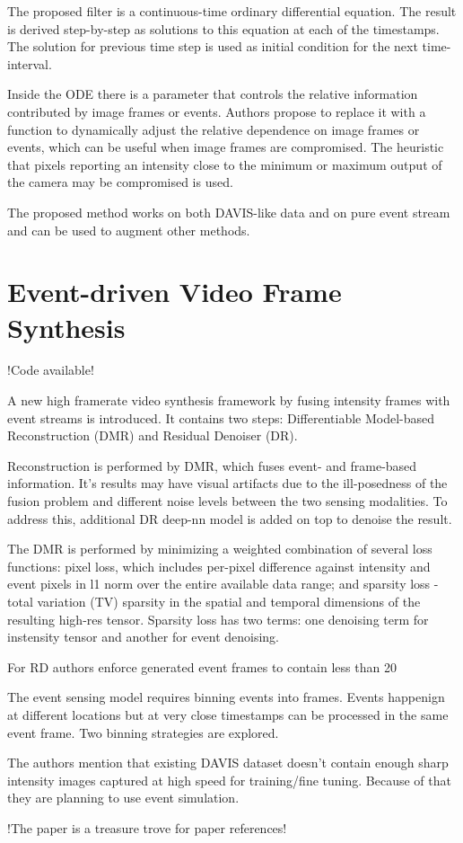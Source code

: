 \documentclass[10pt,a4paper]{article}
\begin{document}
The proposed filter is a continuous-time ordinary differential equation. The result is derived step-by-step as solutions to this equation at each of the timestamps. 
The solution for previous time step is used as initial condition for the next time-interval.

Inside the ODE there is a parameter that controls the relative information contributed by image frames or events. 
Authors propose to replace it with a function to dynamically adjust the relative dependence on image frames or events, which can be useful when image frames are compromised.
The heuristic that pixels reporting an intensity close to the minimum or maximum output of the camera may be compromised is used.

The proposed method works on both DAVIS-like data and on pure event stream and can be used to augment other methods.

\section{Event-driven Video Frame Synthesis}
!Code available!

A new high framerate video synthesis framework by fusing intensity frames with event streams is introduced.
It contains two steps: Differentiable Model-based Reconstruction (DMR) and Residual Denoiser (DR).

Reconstruction is performed by DMR, which fuses event- and frame-based information. 
It's results may have visual artifacts due to the ill-posedness of the fusion problem and different noise levels between the two sensing modalities.
To address this, additional DR deep-nn model is added on top to denoise the result.

The DMR is performed by minimizing a weighted combination of several loss functions: 
pixel loss, which includes per-pixel difference against intensity and event pixels in l1 norm over the entire available data range;
and sparsity loss - total variation (TV) sparsity in the spatial and temporal dimensions of the resulting high-res tensor.
Sparsity loss has two terms: one denoising term for instensity tensor and another for event denoising.

For RD authors enforce generated event frames to contain less than 20%

The event sensing model requires binning events into frames. 
Events happenign at different locations but at very close timestamps can be processed in the same event frame.
Two binning strategies are explored.

The authors mention that existing DAVIS dataset doesn't contain enough sharp intensity images captured at high speed for training/fine tuning. 
Because of that they are planning to use event simulation.

!The paper is a  treasure trove for paper references!
\end{document}

